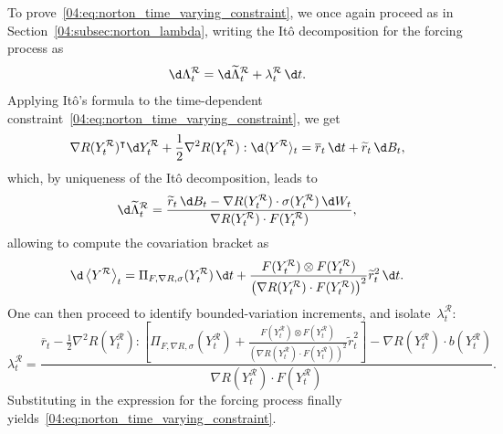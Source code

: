\label{04:appendix:time_dependent_constraints}
To prove~\eqref{04:eq:norton_time_varying_constraint}, we once again proceed as in Section~\ref{04:subsec:norton_lambda}, writing the Itô decomposition for the forcing process as
\[\d \Lambda_t^{\mathcal R} = \d \widetilde{\Lambda}_t^{\mathcal R} + \lambda^{\mathcal R}_t\,\d t.\]
Applying Itô's formula to the time-dependent constraint~\eqref{04:eq:norton_time_varying_constraint}, we get
\[\nabla R(Y^{\mathcal R}_t)^\intercal\d Y^{\mathcal R}_t + \frac12\nabla^2 R(Y^{\mathcal R}_t) : \d \langle Y^{\mathcal R}\rangle_t =  \overline{r}_t\,\d t+\widetilde{r}_t\,\d B_t,\]
which, by uniqueness of the Itô decomposition, leads to
\[\d \widetilde{\Lambda}_t^{\mathcal R} = \frac{ \widetilde{r}_t\,\d B_t -\nabla R(Y_t^{\mathcal{R}})\cdot \sigma(Y_t^{\mathcal R}) \,\d W_t}{\nabla R(Y_t^{\mathcal{R}})\cdot F(Y_t^{\mathcal{R}})},\]
allowing to compute the covariation bracket as
\[\d \left\langle Y^{\mathcal R}\right\rangle_t = \Pi_{F,\nabla R,\sigma}(Y^{\mathcal R}_t)\,\d t +\frac{F(Y^{\mathcal R}_t)\otimes F(Y^{\mathcal R}_t)}{\left(\nabla R(Y^{\mathcal R}_t)\cdot F(Y^{\mathcal R}_t)\right)^2}\widetilde{r}_t^2\, \d t.\]
One can then proceed to identify bounded-variation increments, and isolate~$\lambda^{\mathcal R}_t$:
\[\lambda^{\mathcal R}_t = \frac{\displaystyle{\overline{r}_t-\frac12\nabla^2 R(Y^{\mathcal R}_t) : \left[ \Pi_{F,\nabla R,\sigma}(Y^{\mathcal R}_t) +\frac{F(Y^{\mathcal R}_t)\otimes F(Y^{\mathcal R}_t)}{\left(\nabla R(Y^{\mathcal R}_t)\cdot F(Y^{\mathcal R}_t)\right)^2}\widetilde{r}_t^2\right] - \nabla R(Y^{\mathcal R}_t)\cdot b(Y^{\mathcal R}_t)}}{\nabla R(Y^{\mathcal R}_t) \cdot F(Y^{\mathcal R}_t)}.\]
Substituting in the expression for the forcing process finally yields~\eqref{04:eq:norton_time_varying_constraint}.

